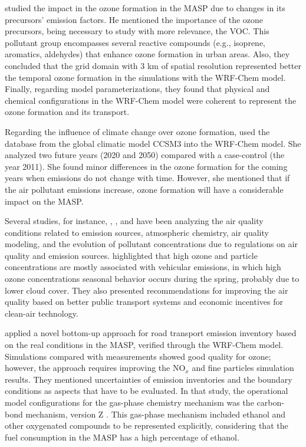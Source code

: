 \citet{Vara2013} studied the impact in the ozone formation in the MASP due to changes in its precursors' emission factors.
He mentioned the importance of the ozone precursors, being necessary to study with more relevance, the VOC.
This pollutant group encompasses several reactive compounds (e.g., isoprene, aromatics, aldehydes) that enhance ozone formation in urban areas.
Also, they concluded that the grid domain with 3 km of spatial resolution represented better the temporal ozone formation in the simulations with the WRF-Chem model.
Finally, regarding model parameterizations, they found that physical and chemical configurations in the WRF-Chem model were coherent to represent the ozone formation and its transport. 

Regarding the influence of climate change over ozone formation, \citet{Mazzoli2013} used the database from the global climatic model CCSM3 into the WRF-Chem model.
She analyzed two future years (2020 and 2050) compared with a case-control (the year 2011). 
She found minor differences in the ozone formation for the coming years when emissions do not change with time. 
However, she mentioned that if the air pollutant emissions increase, ozone formation will have a considerable impact on the MASP.

Several studies, for instance, \citet{Carvalho2015}, \citet{Andrade2015}, and \citet{Andrade2017} have been analyzing the air quality conditions related to emission sources, atmospheric chemistry, air quality modeling, and the evolution of pollutant concentrations due to regulations on air quality and emission sources.
\citet{Carvalho2015} highlighted that high ozone and particle concentrations are mostly associated with vehicular emissions, in which high ozone concentrations seasonal behavior occurs during the spring, probably due to lower cloud cover. %
They also presented recommendations for improving the air quality based on better public transport systems and economic incentives for clean-air technology.

\citet{Andrade2015} applied a novel bottom-up approach for road transport emission inventory based on the real conditions in the MASP, verified through the WRF-Chem model.
Simulations compared with measurements showed good quality for ozone; however, the approach requires improving the NO$_x$ and fine particles simulation results.
They mentioned uncertainties of emission inventories and the boundary conditions as aspects that have to be evaluated.
In that study, the operational model configurations for the gas-phase chemistry mechanism was the carbon-bond mechanism, version Z \citep[CBM-Z;][]{Zaveri1999}.
This gas-phase mechanism included ethanol and other oxygenated compounds to be represented explicitly, considering that the fuel consumption in the MASP has a high percentage of ethanol.

